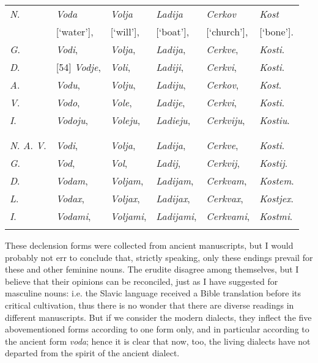 \begin{longtable}{ l l l l l l }
    \lsptoprule
    \multicolumn{6}{ c }{Singular.} \\
    \midrule
    \textit{N}. & \textit{Voda} & \textit{Volja} & \textit{Ladija} & \textit{Cerkov} & \textit{Kost} \\
    & [‘water’], & [‘will’], & [‘boat’], & [‘church’], & [‘bone’]. \\
    \textit{G}. & \textit{Vodi}, & \textit{Volja}, & \textit{Ladija}, & \textit{Cerkve}, & \textit{Kosti}. \\
    \textit{D}. & [54] \textit{Vodje}, & \textit{Voli}, & \textit{Ladiji}, & \textit{Cerkvi}, & \textit{Kosti}. \\
    \textit{A}. & \textit{Vodu}, & \textit{Volju}, & \textit{Ladiju}, & \textit{Cerkov}, & \textit{Kost}. \\
    \textit{V}. & \textit{Vodo}, & \textit{Vole}, & \textit{Ladije}, & \textit{Cerkvi}, & \textit{Kosti}. \\
    \textit{I}. & \textit{Vodoju}, & \textit{Voleju}, & \textit{Ladieju}, & \textit{Cerkviju}, & \textit{Kostiu}. \\
    \lspbottomrule
    \\
    \lsptoprule
    \multicolumn{6}{ c }{Plural.} \\
    \midrule
    \textit{N}. \textit{A}. \textit{V}. & \textit{Vodi}, & \textit{Volja}, & \textit{Ladija}, & \textit{Cerkve}, & \textit{Kosti}. \\
    \textit{G}. & \textit{Vod}, & \textit{Vol}, & \textit{Ladij}, & \textit{Cerkvij}, & \textit{Kostij}. \\
    \textit{D}. & \textit{Vodam}, & \textit{Voljam}, & \textit{Ladijam}, & \textit{Cerkvam}, & \textit{Kostem}. \\
    \textit{L}. & \textit{Vodax}, & \textit{Voljax}, & \textit{Ladijax}, & \textit{Cerkvax}, & \textit{Kostjex}. \\
    \textit{I}. & \textit{Vodami}, & \textit{Voljami}, & \textit{Ladijami}, & \textit{Cerkvami}, & \textit{Kostmi}. \\
    \lspbottomrule
\end{longtable}

These declension forms were collected from ancient manuscripts, but I would probably not err to conclude that, strictly speaking, only these endings prevail for these and other feminine nouns. The erudite disagree among themselves, but I believe that their opinions can be reconciled, just as I have suggested for masculine nouns: i.e. the Slavic language received a Bible translation before its critical cultivation, thus there is no wonder that there are diverse readings in different manuscripts. But if we consider the modern dialects, they inflect the five abovementioned forms according to one form only, and in particular according to the ancient form \textit{voda}; hence it is clear that now, too, the living dialects have not departed from the spirit of the ancient dialect.

